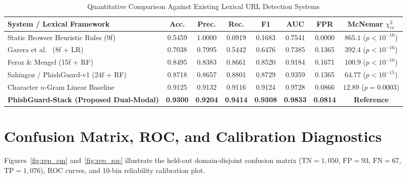 \documentclass[12pt,a4paper]{report}
\begin{document}
\begin{table}[htbp]
\caption{Quantitative Comparison Against Existing Lexical URL Detection Systems}
\label{tab:rep_existing}
\centering
\scriptsize
\renewcommand{\arraystretch}{1.16}
\begin{tabular}{p{4.7cm}ccccccc}
\toprule
\textbf{System / Lexical Framework} & \textbf{Acc.} & \textbf{Prec.} & \textbf{Rec.} & \textbf{F1} & \textbf{AUC} & \textbf{FPR} & \textbf{McNemar $\chi^2_{\text{cc}}$} \\
\midrule
Static Browser Heuristic Rules (9f) & 0.5459 & 1.0000 & 0.0919 & 0.1683 & 0.7541 & 0.0000 & $865.1$ ($p<10^{-16}$) \\
Garera et al.\ \cite{garera2007} (8f + LR) & 0.7038 & 0.7995 & 0.5442 & 0.6476 & 0.7385 & 0.1365 & $392.4$ ($p<10^{-16}$) \\
Feroz \& Mengel \cite{feroz2015} (15f + RF) & 0.8495 & 0.8383 & 0.8661 & 0.8520 & 0.9184 & 0.1671 & $100.9$ ($p<10^{-16}$) \\
Sahingoz / PhishGuard-v1 \cite{sahingoz2019} (24f + RF) & 0.8718 & 0.8657 & 0.8801 & 0.8729 & 0.9359 & 0.1365 & $64.77$ ($p<10^{-15}$) \\
Character $n$-Gram Linear Baseline & 0.9125 & 0.9132 & 0.9116 & 0.9124 & 0.9728 & 0.0866 & $12.89$ ($p=0.0003$) \\
\midrule
\textbf{PhishGuard-Stack (Proposed Dual-Modal)} & \textbf{0.9300} & \textbf{0.9204} & \textbf{0.9414} & \textbf{0.9308} & \textbf{0.9833} & \textbf{0.0814} & \textbf{Reference} \\
\bottomrule
\end{tabular}
\end{table}

\section{Confusion Matrix, ROC, and Calibration Diagnostics}
Figures~\ref{fig:rep_cm} and~\ref{fig:rep_roc} illustrate the held-out domain-disjoint confusion matrix ($\text{TN}=1{,}050$, $\text{FP}=93$, $\text{FN}=67$, $\text{TP}=1{,}076$), ROC curves, and 10-bin reliability calibration plot.
\end{document}
